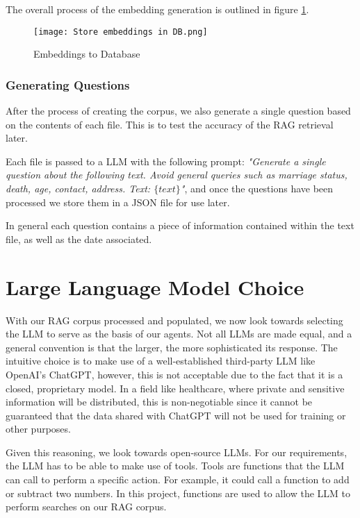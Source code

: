The overall process of the embedding generation is outlined in figure \ref{fig:EmbeddingsDatabase}.

\begin{figure}
	\texttt{[image: Store embeddings in DB.png]}
	\caption{Embeddings to Database}
	\centering
	\label{fig:EmbeddingsDatabase}
\end{figure}

\subsubsection{Generating Questions}

After the process of creating the corpus, we also generate a single question based on the contents of each file. This is to test the accuracy of the RAG retrieval later.

Each file is passed to a LLM with the following prompt: \textit{"Generate a single question about the following text. Avoid general queries such as marriage status, death, age, contact, address. Text: $\{text\}$"}, and once the questions have been processed we store them in a JSON file for use later.

In general each question contains a piece of information contained within the text file, as well as the date associated.
\section{Large Language Model Choice}

With our RAG corpus processed and populated, we now look towards selecting the LLM to serve as the basis of our agents.
Not all LLMs are made equal, and a general convention is that the larger, the more sophisticated its response.
The intuitive choice is to make use of a well-established third-party LLM like OpenAI's ChatGPT, however, this is not acceptable due to the fact that it is a closed, proprietary model. In a field like healthcare, where private and sensitive information will be distributed, this is non-negotiable since it cannot be guaranteed that the data shared with ChatGPT will not be used for training or other purposes.

Given this reasoning, we look towards open-source LLMs. For our requirements, the LLM has to be able to make use of tools. Tools are functions that the LLM can call to perform a specific action. For example, it could call a function to add or subtract two numbers. In this project, functions are used to allow the LLM to perform searches on our RAG corpus.

